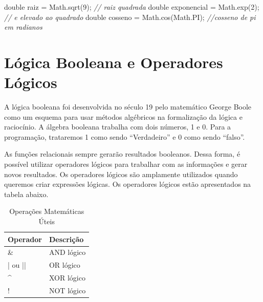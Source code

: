 \documentclass[
]{book}
\newenvironment{Shaded}{\begin{snugshade}}{\end{snugshade}}
\newcommand{\BuiltInTok}[1]{#1}
\newcommand{\CommentTok}[1]{\textcolor[rgb]{0.56,0.35,0.01}{\textit{#1}}}
\newcommand{\DataTypeTok}[1]{\textcolor[rgb]{0.13,0.29,0.53}{#1}}
\newcommand{\DecValTok}[1]{\textcolor[rgb]{0.00,0.00,0.81}{#1}}
\newcommand{\FunctionTok}[1]{\textcolor[rgb]{0.00,0.00,0.00}{#1}}
\newcommand{\NormalTok}[1]{#1}
\begin{document}
\begin{Shaded}
\begin{Highlighting}[]
\DataTypeTok{double}\NormalTok{ raiz = }\BuiltInTok{Math}\NormalTok{.}\FunctionTok{sqrt}\NormalTok{(}\DecValTok{9}\NormalTok{); }\CommentTok{// raiz quadrada}
\DataTypeTok{double}\NormalTok{ exponencial = }\BuiltInTok{Math}\NormalTok{.}\FunctionTok{exp}\NormalTok{(}\DecValTok{2}\NormalTok{); }\CommentTok{// e elevado ao quadrado}
\DataTypeTok{double}\NormalTok{ cosseno  = }\BuiltInTok{Math}\NormalTok{.}\FunctionTok{cos}\NormalTok{(}\BuiltInTok{Math}\NormalTok{.}\FunctionTok{PI}\NormalTok{); }\CommentTok{//cosseno de pi em radianos}
\end{Highlighting}
\end{Shaded}

\hypertarget{luxf3gica-booleana-e-operadores-luxf3gicos}{%
\section{Lógica Booleana e Operadores Lógicos}\label{luxf3gica-booleana-e-operadores-luxf3gicos}}

A lógica booleana foi desenvolvida no século 19 pelo matemático George Boole como um esquema para usar métodos algébricos na formalização da lógica e raciocínio. A álgebra booleana trabalha com dois números, 1 e 0. Para a programação, trataremos 1 como sendo ``Verdadeiro'' e 0 como sendo ``falso''.

As funções relacionais sempre gerarão resultados booleanos. Dessa forma, é possível utilizar operadores lógicos para trabalhar com as informações e gerar novos resultados. Os operadores lógicos são amplamente utilizados quando queremos criar expressões lógicas. Os operadores lógicos estão apresentados na tabela abaixo.

\begin{table}

\caption{\label{tab:unnamed-chunk-8}Operações Matemáticas Úteis}
\centering
\begin{tabular}[t]{l|l}
\hline
Operador & Descrição\\
\hline
\& & AND lógico\\
\hline
| ou || & OR lógico\\
\hline
\textasciicircum{} & XOR lógico\\
\hline
! & NOT lógico\\
\hline
\end{tabular}
\end{table}
\end{document}
